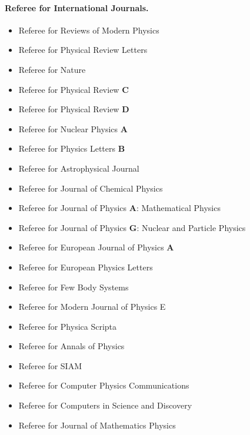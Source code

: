 \documentclass[%
oneside,                 %
final,                   %
10pt]{article}
\begin{document}
\paragraph{Referee for International Journals.}
\begin{itemize}
\item Referee for Reviews of Modern Physics

\item Referee for Physical Review Letters

\item Referee for Nature

\item Referee for Physical Review \textbf{C}

\item Referee for Physical Review \textbf{D}

\item Referee for Nuclear Physics \textbf{A}

\item Referee for Physics Letters \textbf{B}

\item Referee for Astrophysical Journal

\item Referee for Journal of Chemical Physics

\item Referee for Journal of Physics \textbf{A}: Mathematical Physics

\item Referee for Journal of Physics \textbf{G}: Nuclear and Particle Physics

\item Referee for European Journal of Physics \textbf{A}

\item Referee for European Physics Letters

\item Referee for Few Body Systems

\item Referee for Modern Journal of Physics E

\item Referee for Physica Scripta

\item Referee for Annals of Physics

\item Referee for SIAM

\item Referee for Computer Physics Communications

\item Referee for Computers in Science and Discovery

\item Referee for Journal of Mathematics Physics
\end{itemize}
\end{document}
